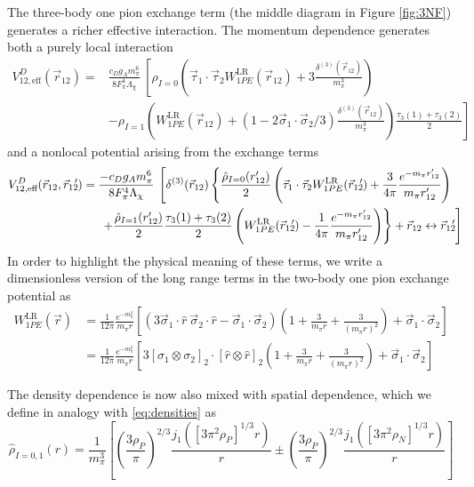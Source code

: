 \documentclass[%
 preprint,
 amsmath,amssymb,
 aps,
]{revtex4-1}
\newcommand{\yukawa}[1]{\frac{e^{-m_\pi |#1|}}{4\pi |#1|}}
\newcommand{\yukawadimless}[1]{\frac{e^{-m_\pi #1}}{m_\pi #1}}
\newcommand{\rot}{\vec{r}_{12}}
\newcommand{\rotp}{\vec{r}_{12}\!\!'}
\newcommand{\taudot}{\vec{\tau}_1\cdot\vec{\tau}_2}
\newcommand{\sigmadot}{\vec{\sigma}_1\cdot\vec{\sigma}_2}
\begin{document}
The three-body one pion exchange term (the middle diagram in Figure \ref{fig:3NF}) generates a richer effective interaction. The momentum dependence generates both a purely local interaction
\begin{equation}\begin{split}
V^{D}_{12,\text{eff}}(\rot)=&\frac{c_D g_Am_\pi^6}{8 F_\pi^4 \Lambda_\chi}\: \left[\rho_{I=0}\left(\taudot W^{\text{LR}}_{1PE}(\rot)  +3\frac{\delta^{(3)}(\rot)}{m_\pi^3}\right) \right. \\
&-\left. \rho_{I=1} \left(W^{\text{LR}}_{1PE}(\rot)+(1-2\sigmadot/3)\frac{\delta^{(3)}(\rot)}{m_\pi^3}\right) \frac{\tau_3(1)+\tau_3(2)}{2} \right]
\end{split}
\end{equation}
and a nonlocal potential arising from the exchange terms
\begin{equation}\begin{split}\label{eqn:1PENonlocal}
V^{D}_{12,\text{eff}}(\rot,\rotp)=\frac{-c_D g_A m_\pi^6}{8 F_\pi^4 \Lambda_\chi}\: \left[ \delta^{(3)}(\rot)\left\{\frac{\hat{\rho}_{I=0}(r'_{12})}{2}\left(\taudot W^{\text{LR}}_{1PE}(\rotp)+\frac{3}{4\pi}\yukawadimless{r'_{12}}\right) \right.\right.& \\
\left.\left.+\frac{\hat{\rho}_{I=1}(r'_{12})}{2}\frac{\tau_3(1)+\tau_3(2)}{2} \left( W^{\text{LR}}_{1PE}(\rotp)-\frac{1}{4\pi}\yukawadimless{r'_{12}}\right) \right\} + \rot \leftrightarrow \rotp \vphantom{\left(\yukawa{r}^2\right)} \right]\hspace{-.25cm}&
\end{split}\end{equation}
In order to highlight the physical meaning of these terms, we write a dimensionless version of the long range terms in the two-body one pion exchange potential as
\begin{equation}\begin{split}
W^{\text{LR}}_{1PE}(\vec{r})&=\frac{1}{12 \pi}\frac{e^{-m_\pi^2}}{m_\pi r}\left[\left(3\vec{\sigma}_1\cdot\hat{r}\:\vec{\sigma}_2\cdot\hat{r}-\sigmadot\right)\left(1+\frac{3}{m_\pi r}+\frac{3}{(m_\pi r)^2}\right)+\sigmadot\right] \\
&=\frac{1}{12 \pi}\frac{e^{-m_\pi^2}}{m_\pi r}\left[3[\sigma_1\otimes\sigma_2]_2\cdot[\hat{r}\otimes\hat{r}]_2\left(1+\frac{3}{m_\pi r}+\frac{3}{(m_\pi r)^2}\right)+\sigmadot\right]
\end{split}
\end{equation}

The density dependence is now also mixed with spatial dependence, which we define in analogy with \eqref{eq:densities} as 
\begin{equation}\label{eq:hatdensities}
\hat{\rho}_{I=0,1}(r)=%
\frac{1}{m_\pi^3}\left[ \left(\frac{3 \rho_P}{\pi}\right)^{2/3} \frac{ j_1( [3\pi^2 \rho_P]^{1/3}  r)}{ r} \pm \left(\frac{3 \rho_P}{\pi}\right)^{2/3} \frac{ j_1( [3\pi^2 \rho_N]^{1/3}  r)}{ r} \right]
\end{equation}
\end{document}
